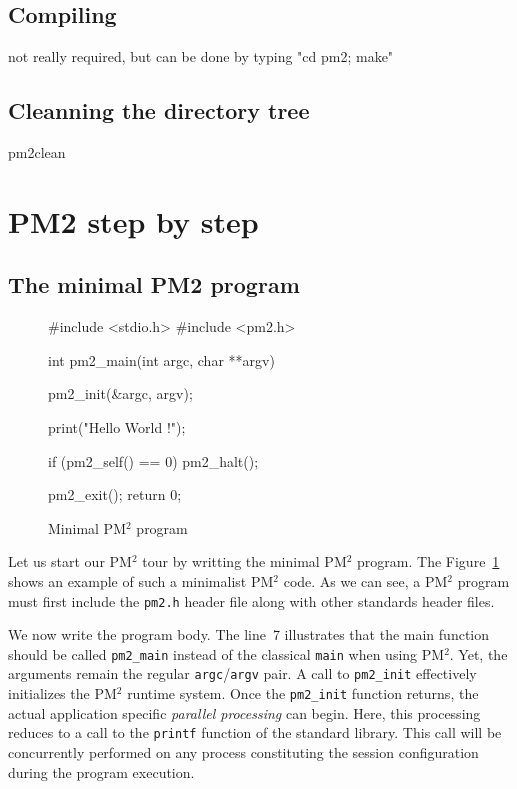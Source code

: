 \documentclass[a4paper,11pt]{article}
\def\pm2{PM$^2$\xspace}
\begin{document}
\subsection{Compiling}
        not really required, but can be done by typing "cd pm2; make"

\subsection{Cleanning the directory tree}
        pm2clean


\section{PM2 step by step}

\subsection{The minimal PM2 program}
\begin{figure}
\begin{center}
\begin{boxedminipage}{0.8\textwidth}
\begin{small}
\begin{listing}{0}
 #include <stdio.h>
 #include <pm2.h>

 int pm2_main(int argc, char **argv)
 {
   pm2_init(&argc, argv);

   print("Hello World !\n");
  
   if (pm2_self() == 0)
     pm2_halt();
  
   pm2_exit();
   return 0;
 }
\end{listing}
\end{small}
\end{boxedminipage}
\end{center}
\caption{Minimal \pm2 program\label{fig:ex1}}
\end{figure}
Let us start our \pm2 tour by writting the minimal \pm2 program. The
Figure~\ref{fig:ex1} shows an example of such a minimalist \pm2
code. As we can see, a \pm2 program must first include the \texttt{pm2.h}
header file along with other standards header files. 

We now write the program body. The line~7 illustrates that the main
function should be called \texttt{pm2\_main} instead of the classical
\texttt{main} when using \pm2. Yet, the arguments remain the regular
\texttt{argc}/\texttt{argv} pair. A call to \texttt{pm2\_init}
effectively initializes the \pm2 runtime system. Once the
\texttt{pm2\_init} function returns, the actual application specific
\emph{parallel processing} can begin. Here, this processing reduces to
a call to the \texttt{printf} function of the standard library. This
call will be concurrently performed on any process constituting the
session configuration during the program execution.
\end{document}
